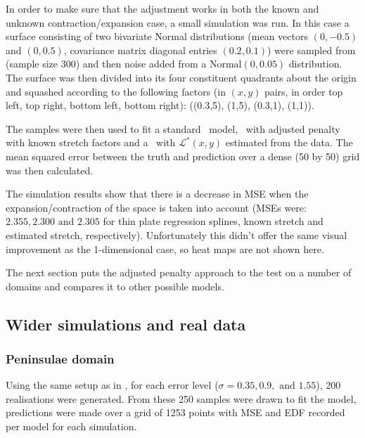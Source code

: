In order to make sure that the adjustment works in both the known and unknown contraction/expansion case, a small simulation was run. In this case a surface consisting of two bivariate Normal distributions (mean vectors $(0,-0.5)$ and $(0,0.5)$, covariance matrix diagonal entries $(0.2,0.1)$) were sampled from (sample size 300) and then noise added from a $\text{Normal}(0,0.05)$ distribution. The surface was then divided into its four constituent quadrants about the origin and squashed according to the following factors (in $(x,y)$ pairs, in order top left, top right, bottom left, bottom right): ((0.3,5), (1,5), (0.3,1), (1,1)).

The samples were then used to fit a standard \tprs\ model, \tprs\ with adjusted penalty with known stretch factors and a \tprs\ with $\mathcal{L}^*(x,y)$ estimated from the data. The mean squared error between the truth and prediction over a dense (50 by 50) grid was then calculated.

The simulation results show that there is a decrease in MSE when the expansion/contraction of the space is taken into account (MSEs were: $2.355, 2.300 \text{ and } 2.305$ for thin plate regression splines, known stretch and estimated stretch, respectively). Unfortunately this didn't offer the same visual improvement as the 1-dimensional case, so heat maps are not shown here.

The next section puts the adjusted penalty approach to the test on a number of domains and compares it to other possible models.

\subsection{Wider simulations and real data}

\subsubsection{Peninsulae domain}
\label{wt2bigsim}

Using the same setup as in , for each error level ($\sigma=0.35, 0.9, \text{ and } 1.55$), 200 realisations were generated. From these 250 samples were drawn to fit the model, predictions were made over a grid of 1253 points with MSE and EDF recorded per model for each simulation. 

